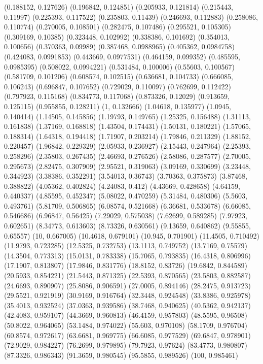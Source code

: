 {(0.188152, 0.127626)
(0.196842, 0.124851)
(0.205933, 0.121814)
(0.215443, 0.11997)
(0.225393, 0.117522)
(0.235803, 0.11439)
(0.246693, 0.112883)
(0.258086, 0.110774)
(0.270005, 0.108501)
(0.282475, 0.107486)
(0.295521, 0.105305)
(0.309169, 0.10385)
(0.323448, 0.102992)
(0.338386, 0.101692)
(0.354013, 0.100656)
(0.370363, 0.09989)
(0.387468, 0.0988965)
(0.405362, 0.0984758)
(0.424083, 0.0991853)
(0.443669, 0.0977531)
(0.464159, 0.099352)
(0.485595, 0.0985395)
(0.508022, 0.0994221)
(0.531484, 0.100006)
(0.55603, 0.100567)
(0.581709, 0.101206)
(0.608574, 0.102515)
(0.636681, 0.104733)
(0.666085, 0.106243)
(0.696847, 0.107652)
(0.729029, 0.110097)
(0.762699, 0.112422)
(0.797923, 0.115168)
(0.834773, 0.117068)
(0.873326, 0.12029)
(0.913659, 0.125115)
(0.955855, 0.128211)
(1, 0.132666)
(1.04618, 0.135977)
(1.0945, 0.140414)
(1.14505, 0.145856)
(1.19793, 0.149765)
(1.25325, 0.156488)
(1.31113, 0.161838)
(1.37169, 0.168818)
(1.43504, 0.174431)
(1.50131, 0.180221)
(1.57065, 0.188314)
(1.64318, 0.194418)
(1.71907, 0.203214)
(1.79846, 0.211329)
(1.88152, 0.220457)
(1.96842, 0.229329)
(2.05933, 0.236927)
(2.15443, 0.247964)
(2.25393, 0.258296)
(2.35803, 0.267435)
(2.46693, 0.276526)
(2.58086, 0.287577)
(2.70005, 0.295673)
(2.82475, 0.307909)
(2.95521, 0.319063)
(3.09169, 0.330699)
(3.23448, 0.344923)
(3.38386, 0.352291)
(3.54013, 0.36743)
(3.70363, 0.375873)
(3.87468, 0.388822)
(4.05362, 0.402824)
(4.24083, 0.412)
(4.43669, 0.428658)
(4.64159, 0.440337)
(4.85595, 0.452347)
(5.08022, 0.470259)
(5.31484, 0.480306)
(5.5603, 0.493761)
(5.81709, 0.506865)
(6.08574, 0.521668)
(6.36681, 0.533678)
(6.66085, 0.546686)
(6.96847, 0.56425)
(7.29029, 0.575038)
(7.62699, 0.589285)
(7.97923, 0.602651)
(8.34773, 0.613603)
(8.73326, 0.630561)
(9.13659, 0.640862)
(9.55855, 0.65557)
(10, 0.667005)
(10.4618, 0.679101)
(10.945, 0.701901)
(11.4505, 0.710492)
(11.9793, 0.723285)
(12.5325, 0.732753)
(13.1113, 0.749752)
(13.7169, 0.75579)
(14.3504, 0.773313)
(15.0131, 0.783338)
(15.7065, 0.793835)
(16.4318, 0.806996)
(17.1907, 0.813807)
(17.9846, 0.831776)
(18.8152, 0.83726)
(19.6842, 0.844589)
(20.5933, 0.854221)
(21.5443, 0.871325)
(22.5393, 0.870565)
(23.5803, 0.882587)
(24.6693, 0.890907)
(25.8086, 0.906591)
(27.0005, 0.894146)
(28.2475, 0.913723)
(29.5521, 0.921919)
(30.9169, 0.916764)
(32.3448, 0.924548)
(33.8386, 0.925978)
(35.4013, 0.932524)
(37.0363, 0.939586)
(38.7468, 0.940625)
(40.5362, 0.942137)
(42.4083, 0.959107)
(44.3669, 0.960813)
(46.4159, 0.957803)
(48.5595, 0.96508)
(50.8022, 0.964065)
(53.1484, 0.974022)
(55.603, 0.970108)
(58.1709, 0.976704)
(60.8574, 0.972617)
(63.6681, 0.969775)
(66.6085, 0.977529)
(69.6847, 0.978901)
(72.9029, 0.984227)
(76.2699, 0.979895)
(79.7923, 0.97624)
(83.4773, 0.980807)
(87.3326, 0.986343)
(91.3659, 0.980545)
(95.5855, 0.989526)
(100, 0.985461)
}

